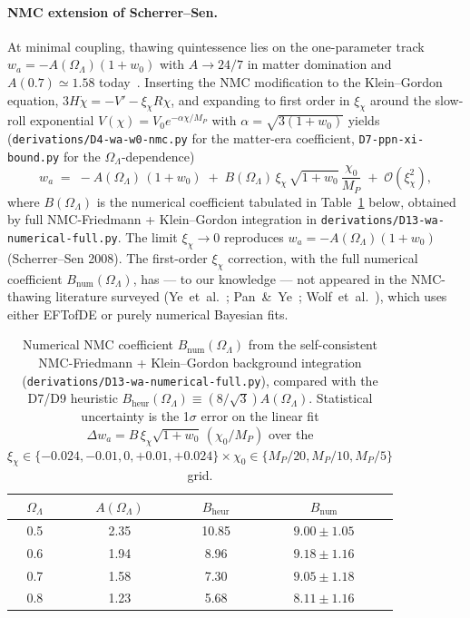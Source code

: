 \paragraph{NMC extension of Scherrer--Sen.}
At minimal coupling, thawing quintessence lies on the one-parameter track
$w_a=-A(\Omega_\Lambda)(1+w_0)$ with $A\!\to\! 24/7$ in matter domination and
$A(0.7)\simeq 1.58$ today~\cite{ScherrerSen2008}. Inserting the NMC modification to the
Klein--Gordon equation, $3H\dot\chi=-V'-\xi_\chi R\chi$, and expanding to first order in
$\xi_\chi$ around the slow-roll exponential $V(\chi)=V_0e^{-\alpha\chi/M_P}$ with
$\alpha=\sqrt{3(1+w_0)}$ yields (\texttt{derivations/D4-wa-w0-nmc.py} for the matter-era
coefficient, \texttt{D7-ppn-xi-bound.py} for the $\Omega_\Lambda$-dependence)
\begin{equation}
  \boxed{\;w_a\;=\;-A(\Omega_\Lambda)\,(1+w_0)
                 \;+\;B(\Omega_\Lambda)\,\xi_\chi\,\sqrt{1+w_0}\,
                      \frac{\chi_0}{M_P}\;+\;\mathcal{O}(\xi_\chi^{2}),\;}
  \label{eq:wa_NMC}
\end{equation}
where $B(\Omega_\Lambda)$ is the numerical coefficient tabulated in
Table~\ref{tab:B_of_OmegaL} below, obtained by full NMC-Friedmann + Klein--Gordon
integration in \texttt{derivations/D13-wa-numerical-full.py}. The limit
$\xi_\chi\to 0$ reproduces $w_a=-A(\Omega_\Lambda)(1+w_0)$ (Scherrer--Sen
2008). The first-order $\xi_\chi$ correction, with the full numerical
coefficient $B_{\mathrm{num}}(\Omega_\Lambda)$, has --- to our knowledge ---
not appeared in the NMC-thawing literature surveyed
(Ye~et~al.~\cite{Ye2025}; Pan~\&~Ye~\cite{PanYe2026}; Wolf~et~al.~\cite{Wolf2025}),
which uses either EFTofDE or purely numerical Bayesian fits.

\begin{table}[h]
\centering
\caption{Numerical NMC coefficient $B_{\mathrm{num}}(\Omega_\Lambda)$ from the
self-consistent NMC-Friedmann + Klein--Gordon background integration
(\texttt{derivations/D13-wa-numerical-full.py}), compared with the D7/D9
heuristic $B_{\mathrm{heur}}(\Omega_\Lambda)\equiv(8/\sqrt3)A(\Omega_\Lambda)$.
Statistical uncertainty is the 1$\sigma$ error on the linear fit
$\Delta w_a = B\,\xi_\chi\sqrt{1+w_0}\,(\chi_0/M_P)$ over the
$\xi_\chi\in\{{-}0.024,{-}0.01,0,{+}0.01,{+}0.024\}\times\chi_0\in\{M_P/20,M_P/10,M_P/5\}$ grid.}
\label{tab:B_of_OmegaL}
\begin{tabular}{@{}cccc@{}}
\hline
$\Omega_\Lambda$ & $A(\Omega_\Lambda)$ & $B_{\mathrm{heur}}$ & $B_{\mathrm{num}}$ \\
\hline
0.5 & 2.35 & 10.85 & $9.00\pm1.05$ \\
0.6 & 1.94 &  8.96 & $9.18\pm1.16$ \\
0.7 & 1.58 &  7.30 & $9.05\pm1.18$ \\
0.8 & 1.23 &  5.68 & $8.11\pm1.16$ \\
\hline
\end{tabular}
\end{table}

